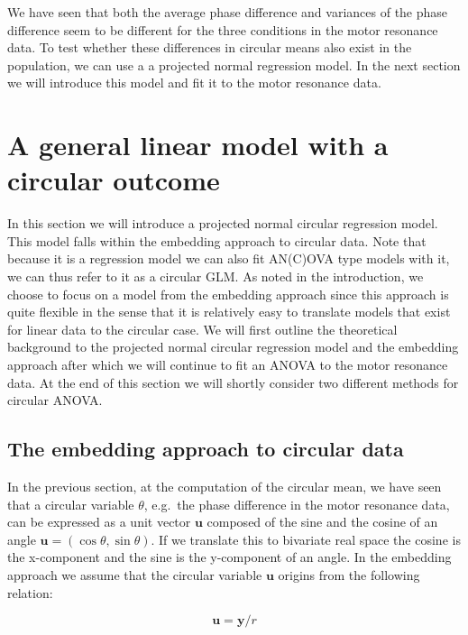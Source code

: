 \documentclass[11pt,]{article}
\begin{document}
We have seen that both the average phase difference and variances of the
phase difference seem to be different for the three conditions in the
motor resonance data. To test whether these differences in circular
means also exist in the population, we can use a a projected normal
regression model. In the next section we will introduce this model and
fit it to the motor resonance data.

\section{A general linear model with a circular outcome}\label{RegModel}

In this section we will introduce a projected normal circular regression
model. This model falls within the embedding approach to circular data.
Note that because it is a regression model we can also fit AN(C)OVA type
models with it, we can thus refer to it as a circular GLM. As noted in
the introduction, we choose to focus on a model from the embedding
approach since this approach is quite flexible in the sense that it is
relatively easy to translate models that exist for linear data to the
circular case. We will first outline the theoretical background to the
projected normal circular regression model and the embedding approach
after which we will continue to fit an ANOVA to the motor resonance
data. At the end of this section we will shortly consider two different
methods for circular ANOVA.

\subsection{The embedding approach to circular data}\label{EmbeddingApproach}

In the previous section, at the computation of the circular mean, we
have seen that a circular variable \(\theta\), e.g.~the phase difference
in the motor resonance data, can be expressed as a unit vector
\(\boldsymbol{u}\) composed of the sine and the cosine of an angle
\(\boldsymbol{u} = (\cos\theta, \sin\theta)\). If we translate this to
bivariate real space the cosine is the x-component and the sine is the
y-component of an angle. In the embedding approach we assume that the
circular variable \(\boldsymbol{u}\) origins from the following
relation:

\begin{equation}\label{embedding}
 \boldsymbol{u} = \boldsymbol{y} / r 
\end{equation}
\end{document}
